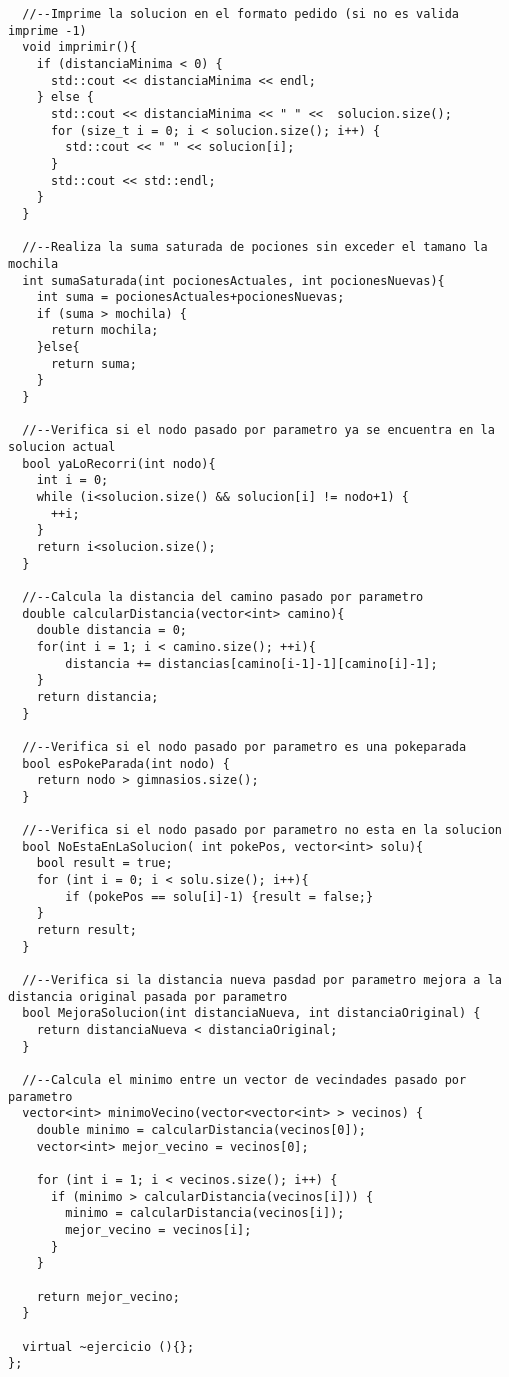 \begin{lstlisting}
  //--Imprime la solucion en el formato pedido (si no es valida imprime -1)
  void imprimir(){
    if (distanciaMinima < 0) {
      std::cout << distanciaMinima << endl;
    } else {
      std::cout << distanciaMinima << " " <<  solucion.size();
      for (size_t i = 0; i < solucion.size(); i++) {
        std::cout << " " << solucion[i];
      }
      std::cout << std::endl;
    }
  }

  //--Realiza la suma saturada de pociones sin exceder el tamano la mochila
  int sumaSaturada(int pocionesActuales, int pocionesNuevas){
    int suma = pocionesActuales+pocionesNuevas;
    if (suma > mochila) {
      return mochila;
    }else{
      return suma;
    }
  }

  //--Verifica si el nodo pasado por parametro ya se encuentra en la solucion actual
  bool yaLoRecorri(int nodo){
    int i = 0;
    while (i<solucion.size() && solucion[i] != nodo+1) {
      ++i;
    }
    return i<solucion.size();
  }

  //--Calcula la distancia del camino pasado por parametro
  double calcularDistancia(vector<int> camino){
    double distancia = 0;
    for(int i = 1; i < camino.size(); ++i){
        distancia += distancias[camino[i-1]-1][camino[i]-1];
    }
    return distancia;
  }

  //--Verifica si el nodo pasado por parametro es una pokeparada
  bool esPokeParada(int nodo) {
    return nodo > gimnasios.size();
  }

  //--Verifica si el nodo pasado por parametro no esta en la solucion
  bool NoEstaEnLaSolucion( int pokePos, vector<int> solu){
    bool result = true;
    for (int i = 0; i < solu.size(); i++){
        if (pokePos == solu[i]-1) {result = false;}
    }
    return result;
  }

  //--Verifica si la distancia nueva pasdad por parametro mejora a la distancia original pasada por parametro
  bool MejoraSolucion(int distanciaNueva, int distanciaOriginal) {
    return distanciaNueva < distanciaOriginal;
  }

  //--Calcula el minimo entre un vector de vecindades pasado por parametro
  vector<int> minimoVecino(vector<vector<int> > vecinos) {
    double minimo = calcularDistancia(vecinos[0]);
    vector<int> mejor_vecino = vecinos[0];

    for (int i = 1; i < vecinos.size(); i++) {
      if (minimo > calcularDistancia(vecinos[i])) {
        minimo = calcularDistancia(vecinos[i]);
        mejor_vecino = vecinos[i];
      }
    }

    return mejor_vecino;
  }

  virtual ~ejercicio (){};
};
\end{lstlisting}


